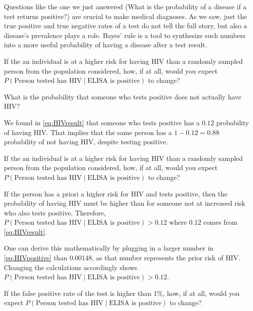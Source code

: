 \documentclass[]{book}
\theoremstyle{definition}
\theoremstyle{definition}
\theoremstyle{definition}
\theoremstyle{remark}
\let\BeginKnitrBlock\begin \let\EndKnitrBlock\end
\begin{document}
Questions like the one we just answered (What is the probability of a
disease if a test returns positive?) are crucial to make medical
diagnoses. As we saw, just the true positive and true negative rates of
a test do not tell the full story, but also a disease's prevalence plays
a role. Bayes' rule is a tool to synthesize such numbers into a more
useful probability of having a disease after a test result.

If the an individual is at a higher risk for having HIV than a randomly
sampled person from the population considered, how, if at all, would you
expect \(P(\text{Person tested has HIV} \mid \text{ELISA is positive})\)
to change?

\BeginKnitrBlock{example}
\protect\hypertarget{exm:unnamed-chunk-3}{}\label{exm:unnamed-chunk-3} What
is the probability that someone who tests positive does not actually
have HIV?
\EndKnitrBlock{example}

We found in \eqref{eq:HIVresult} that someone who tests positive has a
\(0.12\) probability of having HIV. That implies that the same person
has a \(1-0.12=0.88\) probability of not having HIV, despite testing
positive.

\BeginKnitrBlock{example}
\protect\hypertarget{exm:unnamed-chunk-4}{}\label{exm:unnamed-chunk-4} If
the an individual is at a higher risk for having HIV than a randomly
sampled person from the population considered, how, if at all, would you
expect \(P(\text{Person tested has HIV} \mid \text{ELISA is positive})\)
to change?
\EndKnitrBlock{example}

If the person has a priori a higher risk for HIV and tests positive,
then the probability of having HIV must be higher than for someone not
at increased risk who also tests positive. Therefore,
\(P(\text{Person tested has HIV} \mid \text{ELISA is positive}) > 0.12\)
where \(0.12\) comes from \eqref{eq:HIVresult}.

One can derive this mathematically by plugging in a larger number in
\eqref{eq:HIVpositive} than 0.00148, as that number represents the prior
risk of HIV. Changing the calculations accordingly shows
\(P(\text{Person tested has HIV} \mid \text{ELISA is positive}) > 0.12\).

\BeginKnitrBlock{example}
\protect\hypertarget{exm:unnamed-chunk-5}{}\label{exm:unnamed-chunk-5} If
the false positive rate of the test is higher than 1\%, how, if at all,
would you expect
\(P(\text{Person tested has HIV} \mid \text{ELISA is positive})\) to
change?
\EndKnitrBlock{example}
\end{document}
